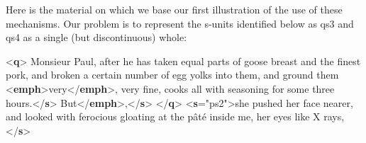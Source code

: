 Here is the material on which we base our first illustration of the use of these mechanisms. Our problem is to represent the s-units identified below as qs3 and qs4 as a single (but discontinuous) whole: \par\bgroup{}\exampleFont \begin{shaded}\noindent\mbox{}{<\textbf{q}>}\mbox{}\newline 
{}Monsieur Paul, after he has taken equal\mbox{}\newline 
\hspace*{1em}\hspace*{1em} parts of goose breast and the finest pork, and\mbox{}\newline 
\hspace*{1em}\hspace*{1em} broken a certain number of egg yolks into them,\mbox{}\newline 
\hspace*{1em}\hspace*{1em} and ground them {<\textbf{emph}>}very{</\textbf{emph}>}, very fine,\mbox{}\newline 
\hspace*{1em}\hspace*{1em} cooks all with seasoning for some three hours.{</\textbf{s}>}\mbox{}\newline 
{}\mbox{}\newline 
\hspace*{1em}But{</\textbf{emph}>},{</\textbf{s}>}\mbox{}\newline 
{</\textbf{q}>}\mbox{}\newline 
{<\textbf{s}\hspace*{1em}{xml:id}="{ps2}">}she pushed her face nearer, and looked with\mbox{}\newline 
 ferocious gloating at the pâté\mbox{}\newline 
 inside me, her eyes like X rays,{</\textbf{s}>}\mbox{}\newline 

\end{shaded}
